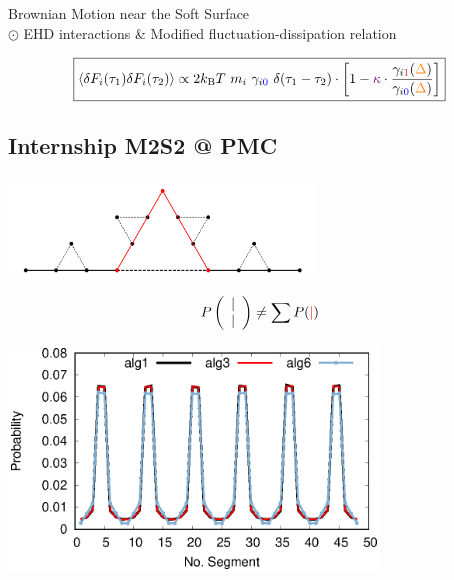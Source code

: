 \documentclass[9pt]{beamer}
\newcommand{\ssc}{\subsection}
\newcommand{\mrm}{\mathrm}
\newcommand{\llp}{\left(}
\newcommand{\rrp}{\right)}
\newcommand{\lls}{\left[}
\newcommand{\rrs}{\right]}
\newcommand{\lla}{\left\langle}
\newcommand{\rra}{\right\rangle}
\newcommand{\dlt}{\delta}
\newcommand{\gma}{\gamma}
\begin{document}
\begin{frame}[noframenumbering]{Brownian Motion near the Soft Surface \\
\textcolor{ChimieBlue}{$\odot$ EHD interactions \& Modified fluctuation-dissipation relation}}
\begin{center}
\end{center}
$$ \boxed{ \lla \dlt F_i(\tau_1) \dlt F_i(\tau_2) \rra \propto 2 k_\mrm{B} T \ m_i \  \gma_{i\textcolor{blue}{0}} \ \dlt(\tau_1 - \tau_2) \cdot \lls 1 - \textcolor{violet}{\kappa} \cdot \frac{\gma_{i\textcolor{red}{1}} ({\blendcolors*{!90}\textcolor{orange}{\Delta}}) }{\gma_{i\textcolor{blue}{0}} ({\blendcolors*{!90}\textcolor{orange}{\Delta}})} \rrs } $$



\end{frame}





\ssc{Internship M2S2 @ PMC}
\begin{frame}[noframenumbering]
	\frametitle{}

	\begin{minipage}{0.6\linewidth}
		\includegraphics[height=2.5cm]{figs/no_ana.png}
	\end{minipage}
	\begin{minipage}{0.39\linewidth}
		\Huge $$ P \llp \begin{array}{c} | \\|\end{array}\rrp \neq \sum P(\textcolor{red}{|}) $$
	\end{minipage}
	\begin{center}
    	\includegraphics[height=6cm]{figs/pbb_g2_EDIPP.eps}
	\end{center}
\end{frame}
\end{document}
